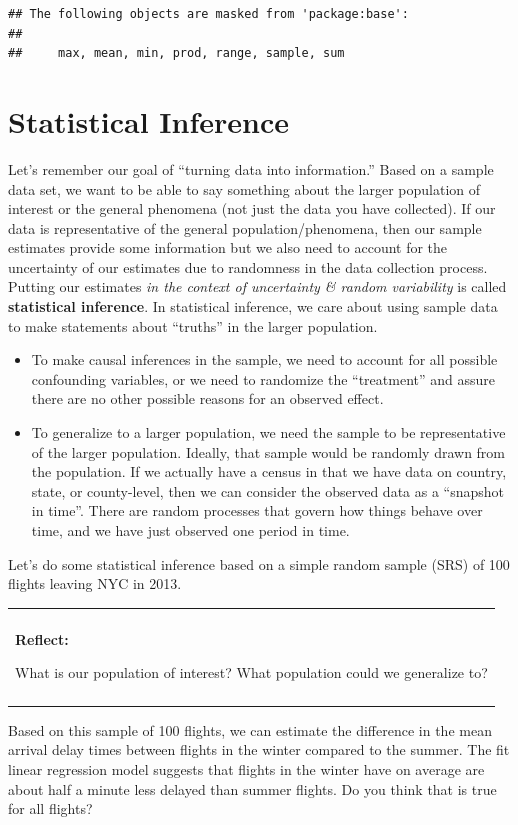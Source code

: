 \documentclass[
]{book}
\providecommand{\tightlist}{%
  \setlength{\itemsep}{0pt}\setlength{\parskip}{0pt}}
\newenvironment{reflect}
{
    \begin{center}
    
    \begin{tabular}{|p{0.8\textwidth}|}
    \rowcolor{LightBlue}
    \hline\\
    \rowcolor{LightBlue}
    \textbf{Reflect:}
}
{
    \\\rowcolor{LightBlue}
    \\\hline
    \end{tabular} 
    \end{center}
}
\begin{document}
\begin{verbatim}
## The following objects are masked from 'package:base':
## 
##     max, mean, min, prod, range, sample, sum
\end{verbatim}

\hypertarget{statistical-inference}{%
\chapter{Statistical Inference}\label{statistical-inference}}

Let's remember our goal of ``turning data into information.'' Based on a sample data set, we want to be able to say something about the larger population of interest or the general phenomena (not just the data you have collected). If our data is representative of the general population/phenomena, then our sample estimates provide some information but we also need to account for the uncertainty of our estimates due to randomness in the data collection process. Putting our estimates \emph{in the context of uncertainty \& random variability} is called \textbf{statistical inference}. In statistical inference, we care about using sample data to make statements about ``truths'' in the larger population.

\begin{itemize}
\tightlist
\item
  To make causal inferences in the sample, we need to account for all possible confounding variables, or we need to randomize the ``treatment'' and assure there are no other possible reasons for an observed effect.
\item
  To generalize to a larger population, we need the sample to be representative of the larger population. Ideally, that sample would be randomly drawn from the population. If we actually have a census in that we have data on country, state, or county-level, then we can consider the observed data as a ``snapshot in time''. There are random processes that govern how things behave over time, and we have just observed one period in time.
\end{itemize}

Let's do some statistical inference based on a simple random sample (SRS) of 100 flights leaving NYC in 2013.

\begin{reflect}
What is our population of interest? What population could we generalize
to?
\end{reflect}

Based on this sample of 100 flights, we can estimate the difference in the mean arrival delay times between flights in the winter compared to the summer. The fit linear regression model suggests that flights in the winter have on average are about half a minute less delayed than summer flights. Do you think that is true for all flights?
\end{document}
